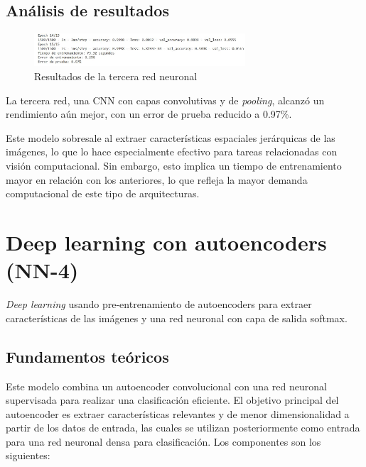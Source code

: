 \subsection{Análisis de resultados}

\begin{figure}[H]
	\centering
	\includegraphics[width=0.7\textwidth]{imgs/results-red3.JPG}
	\caption{Resultados de la tercera red neuronal}
	\label{fig:results-red3}
\end{figure}

La tercera red, una CNN con capas convolutivas y de \textit{pooling}, alcanzó un rendimiento aún mejor, con un error de prueba reducido a 0.97\%.

Este modelo sobresale al extraer características espaciales jerárquicas de las imágenes, lo que lo hace especialmente efectivo para tareas relacionadas con visión computacional. Sin embargo, esto implica un tiempo de entrenamiento mayor en relación con los anteriores, lo que refleja la mayor demanda computacional de este tipo de arquitecturas.

\section{Deep learning con autoencoders (NN-4)}

\textit{Deep learning} usando pre-entrenamiento de autoencoders para extraer características de las imágenes y una red neuronal con capa de salida softmax.

\subsection{Fundamentos teóricos}

Este modelo combina un autoencoder convolucional con una red neuronal supervisada para realizar una clasificación eficiente. El objetivo principal del autoencoder es extraer características relevantes y de menor dimensionalidad a partir de los datos de entrada, las cuales se utilizan posteriormente como entrada para una red neuronal densa para clasificación. Los componentes son los siguientes:

